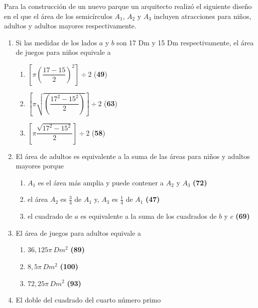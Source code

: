 \documentclass[letterpaper,11pt,twoside]{article}
\begin{document}
\begin{multicols}{2}
Para la construcción de un nuevo parque un arquitecto realizó el siguiente diseño en el que el área de los semicírculos $A_{1}$, $A_{2}$ y $A_{3}$ incluyen atracciones para niños, adultos y adultos mayores respectivamente.
\begin{enumerate}
\item \label{q01} Si las medidas de los lados $a$ y $b$ son 17 Dm y 15 Dm respectivamente, el área de juegos para niños equivale a
\begin{enumerate}
\item $\left[\pi \left(\dfrac{17-15}{2}\right)^{2}\right]\div 2$ \qquad (\textbf{49})
\item $\left[\pi \sqrt{\left(\dfrac{17^{2}-15^{2}}{2}\right)}\right]\div 2$ \qquad (\textbf{63})
\item $\left[\pi \dfrac{\sqrt{17^{2}-15^{2}}}{2}\right]\div 2$ \qquad (\textbf{58})
\end{enumerate}
\item \label{q02} El área de adultos es equivalente a la suma de las áreas para niños y adultos mayores porque
\begin{enumerate}
\item $A_{1}$ es el área más amplia y puede contener a $A_{2}$ y $A_{3}$ \quad \textbf{(72)}
\item el área $A_{2}$ es $\frac{3}{4}$ de $A_{1}$ y, $A_{3}$ es $\frac{1}{4}$ de $A_{1}$ \quad \textbf{(47)}
\item el cuadrado de $a$ es equivalente a la suma de los cuadrados de $b$ y $c$ \quad \textbf{(69)}
\end{enumerate}
\item El área de juegos para adultos equivale a
\begin{enumerate}
\item $36,125\pi\, Dm^{2}$ \quad \textbf{(89)}
\item $8,5\pi \, Dm^{2}$ \quad \textbf{(100)}
\item $72,25\pi \, Dm^{2}$ \quad \textbf{(93)}
\end{enumerate}
\item El doble del cuadrado del cuarto número primo

\end{enumerate}
\end{multicols}
\end{document}
